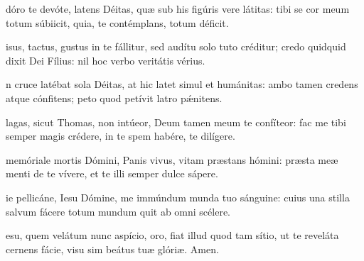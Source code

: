 \begin{multicols}{2}

\renewcommand{\columnseprulecolor}{\color{rubrica}}
\renewcommand{\columnseprule}{0.4pt}


 dóro te devóte, latens Déitas, quæ sub his figúris vere látitas: tibi se cor meum totum súbiicit, quia, te contémplans, totum déficit.

 isus, tactus, gustus in te fállitur, sed audítu solo tuto créditur; credo quidquid dixit Dei Fílius: nil hoc verbo veritátis vérius.

 n cruce latébat sola Déitas, at hic latet simul et humánitas: ambo tamen credens atque cónfitens; peto quod petívit latro p\'  \ae nitens.

 lagas, sicut Thomas, non intúeor, Deum tamen meum te confíteor: fac me tibi semper magis crédere, in te spem habére, te dilígere.

 memóriale mortis Dómini, Panis vivus, vitam præstans hómini: præsta meæ menti de te vívere, et te illi semper dulce sápere.

 ie pellicáne, Iesu Dómine, me immúndum munda tuo sán\-gui\-ne: cuius una stilla salvum fácere totum mundum quit ab omni scélere.

 esu, quem velátum nunc aspício, oro, fiat illud quod tam sítio, ut te reveláta cernens fácie, visu sim beátus tuæ glóriæ. Amen.

\end{multicols}
